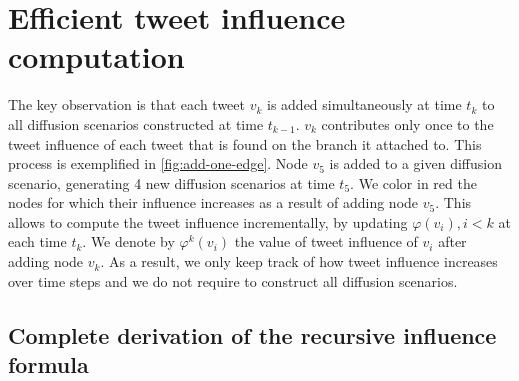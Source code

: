 \section{Efficient tweet influence computation}
\label{si-sec:efficient-algo}

The key observation is that each tweet $v_k$ is added simultaneously at time $t_k$ to all diffusion scenarios constructed at time $t_{k-1}$.
$v_k$ contributes only once to the tweet influence of each tweet that is found on the branch it attached to.
This process is exemplified in \cref{fig:add-one-edge}.
Node $v_5$ is added to a given diffusion scenario, generating 4 new diffusion scenarios at time $t_5$.
We color in red the nodes for which their influence increases as a result of adding node $v_5$.
%
This allows to compute the tweet influence incrementally, by updating $\varphi(v_i), i < k$ at each time $t_k$.
We denote by $\varphi^k(v_i)$ the value of tweet influence of $v_i$ after adding node $v_k$.
As a result, we only keep track of how tweet influence increases over time steps and we do not require to construct all diffusion scenarios.

\subsection{Complete derivation of the recursive influence formula}

